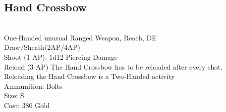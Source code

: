 \subsection{Hand Crossbow}\label{weapon:handCrossbow}\\
One-Handed unusual Ranged Weapon,  Reach, DE\\
Draw/Sheath(2AP/4AP)\\
Shoot (1 AP): 1d12 Piercing Damage\\
Reload (3 AP) The Hand Crossbow has to be reloaded after every shot.\\
Reloading the Hand Crossbow is a Two-Handed activity\\
Ammunition: Bolts\\
Size: S\\
Cost: 380 Gold\\